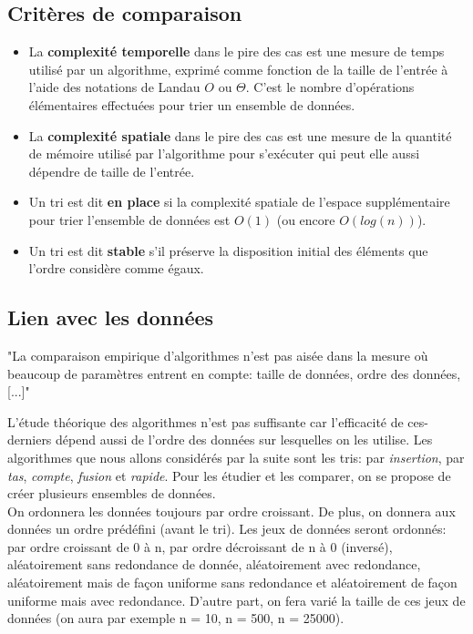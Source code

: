 \documentclass[12pt]{article}
\begin{document}
		\subsection{Critères de comparaison}
			\begin{itemize}
				\item[\textbullet] La \textbf{complexité temporelle} dans le pire des cas est une mesure de temps utilisé par un algorithme, exprimé comme fonction de la taille de l'entrée à l'aide des notations de Landau $O$ ou $\Theta$. C'est le nombre d'opérations élémentaires effectuées pour trier un ensemble de données. \\
				\item[\textbullet] La \textbf{complexité spatiale} dans le pire des cas est une mesure de la quantité de mémoire utilisé par l'algorithme pour s'exécuter qui peut elle aussi dépendre de taille de l'entrée. \\
				\item[\textbullet] Un tri est dit \textbf{en place} si la complexité spatiale de l'espace supplémentaire pour trier l'ensemble de données est \textbf{$O(1)$} (ou encore \textbf{$O(log(n))$}). \\
				\item[\textbullet] Un tri est dit \textbf{stable} s'il préserve la disposition initial des éléments que l'ordre considère comme égaux. \\
			\end{itemize}
			
		\subsection{Lien avec les données}
			\begin{history}
				"La comparaison empirique d'algorithmes n'est pas aisée dans la mesure où beaucoup de paramètres entrent en compte: taille de données, ordre des données, [...]"
			\end{history}
			L'étude théorique des algorithmes n'est pas suffisante car l'efficacité de ces-derniers dépend aussi de l'ordre des données sur lesquelles on les utilise. Les algorithmes que nous allons considérés par la suite sont les tris: par \textit{insertion}, par \textit{tas}, \textit{compte}, \textit{fusion} et \textit{rapide}. Pour les étudier et les comparer, on se propose de créer plusieurs ensembles de données. \\
			
			On ordonnera les données toujours par ordre croissant. De plus, on donnera aux données un ordre prédéfini (avant le tri). Les jeux de données seront ordonnés: par ordre croissant de 0 à n, par ordre décroissant de n à 0 (inversé), aléatoirement sans redondance de donnée, aléatoirement avec redondance, aléatoirement mais de façon uniforme sans redondance et aléatoirement de façon uniforme mais avec redondance. D'autre part, on fera varié la taille de ces jeux de données (on aura par exemple n = 10, n = 500, n = 25000). \\
		
\end{document}

